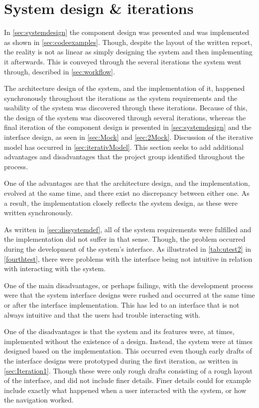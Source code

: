 \section{System design \& iterations}\label{sec:dissystemdes}

In \cref{sec:systemdesign} the component design was presented and was implemented as shown in \cref{sec:codeexamples}.
Though, despite the layout of the written report, the reality is not as linear as simply designing the system and then implementing it afterwards.
This is conveyed through the several iterations the system went through, described in \cref{sec:workflow}.

The architecture design of the system, and the implementation of it, happened synchronously throughout the iterations as the system requirements and the usability of the system was discovered through these iterations.
Because of this, the design of the system was discovered through several iterations, whereas the final iteration of the component design is presented in \cref{sec:systemdesign} and the interface design, as seen in \cref{sec:Mock} and \ref{sec:2Mock}.
Discussion of the iterative model has occurred in \cref{sec:iterativModel}.
This section seeks to add additional advantages and disadvantages that the project group identified throughout the process.

One of the advantages are that the architecture design, and the implementation, evolved at the same time, and there exist no discrepancy between either one.
As a result, the implementation closely reflects the system design, as these were written synchronously.

As written in \cref{sec:dissystemdef}, all of the system requirements were fulfilled and the implementation did not suffer in that sense.
Though, the problem occurred during the development of the system's interface.
As illustrated in \cref{tab:utest2} in \cref{fourthtest}, there were problems with the interface being not intuitive in relation with interacting with the system.

One of the main disadvantages, or perhaps failings, with the development process were that the system interface designs were rushed and occurred at the same time or after the interface implementation.
This has led to an interface that is not always intuitive and that the users had trouble interacting with.

One of the disadvantages is that the system and its features were, at times, implemented without the existence of a design.
Instead, the system were at times designed based on the implementation.
This occurred even though early drafts of the interface designs were prototyped during the first iteration, as written in \cref{sec:Iteration1}.
Though these were only rough drafts consisting of a rough layout of the interface, and did not include finer details.
Finer details could for example include exactly what happened when a user interacted with the system, or how the navigation worked.

